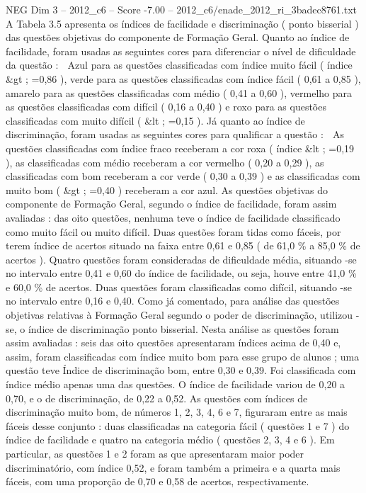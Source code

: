 \begin{textsample}{NEG Dim 3 – 2012\_c6 – Score -7.00 – 2012\_c6/enade\_2012\_ri\_3badec8761.txt}
A Tabela 3.5 apresenta os índices de facilidade e discriminação ( ponto bisserial ) das questões objetivas do componente de Formação Geral.
Quanto ao índice de facilidade, foram usadas as seguintes cores para diferenciar o nível de dificuldade da questão :  Azul para as questões classificadas com índice muito fácil ( índice \&gt ; =0,86 ), verde para as questões classificadas com índice fácil ( 0,61 a 0,85 ), amarelo para as questões classificadas com médio ( 0,41 a 0,60 ), vermelho para as questões classificadas com difícil ( 0,16 a 0,40 ) e roxo para as questões classificadas com muito difícil ( \&lt ; =0,15 ).
Já quanto ao índice de discriminação, foram usadas as seguintes cores para qualificar a questão :  As questões classificadas com índice fraco receberam a cor roxa ( índice \&lt ; =0,19 ), as classificadas com médio receberam a cor vermelho ( 0,20 a 0,29 ), as classificadas com bom receberam a cor verde ( 0,30 a 0,39 ) e as classificadas com muito bom ( \&gt ; =0,40 ) receberam a cor azul.
As questões objetivas do componente de Formação Geral, segundo o índice de facilidade, foram assim avaliadas : das oito questões, nenhuma teve o índice de facilidade classificado como muito fácil ou muito difícil.
Duas questões foram tidas como fáceis, por terem índice de acertos situado na faixa entre 0,61 e 0,85 ( de 61,0 \% a 85,0 \% de acertos ).
Quatro questões foram consideradas de dificuldade média, situando -se no intervalo entre 0,41 e 0,60 do índice de facilidade, ou seja, houve entre 41,0 \% e 60,0 \% de acertos.
Duas questões foram classificadas como difícil, situando -se no intervalo entre 0,16 e 0,40.
Como já comentado, para análise das questões objetivas relativas à Formação Geral segundo o poder de discriminação, utilizou -se, o índice de discriminação ponto bisserial.
Nesta análise as questões foram assim avaliadas : seis das oito questões apresentaram índices acima de 0,40 e, assim, foram classificadas com índice muito bom para esse grupo de alunos ; uma questão teve Índice de discriminação bom, entre 0,30 e 0,39.
Foi classificada com índice médio apenas uma das questões.
O índice de facilidade variou de 0,20 a 0,70, e o de discriminação, de 0,22 a 0,52.
As questões com índices de discriminação muito bom, de números 1, 2, 3, 4, 6 e 7, figuraram entre as mais fáceis desse conjunto : duas classificadas na categoria fácil ( questões 1 e 7 ) do índice de facilidade e quatro na categoria médio ( questões 2, 3, 4 e 6 ).
Em particular, as questões 1 e 2 foram as que apresentaram maior poder discriminatório, com índice 0,52, e foram também a primeira e a quarta mais fáceis, com uma proporção de 0,70 e 0,58 de acertos, respectivamente.

\end{textsample}
